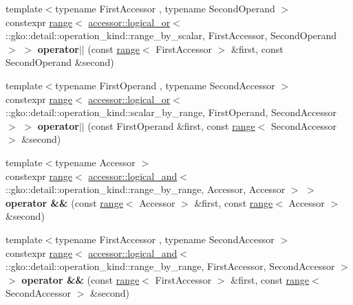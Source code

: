 \begin{DoxyCompactItemize}
\item 
\mbox{\label{namespacegko_ad2e2f0c77efabd6d47e3dbb4b2a8270b}} 
{\footnotesize template$<$typename First\+Accessor , typename Second\+Operand $>$ }\\constexpr \hyperlink{classgko_1_1range}{range}$<$ \hyperlink{structgko_1_1accessor_1_1logical__or}{accessor\+::logical\+\_\+or}$<$ \+::gko\+::detail\+::operation\+\_\+kind\+::range\+\_\+by\+\_\+scalar, First\+Accessor, Second\+Operand $>$ $>$ {\bfseries operator$\vert$$\vert$} (const \hyperlink{classgko_1_1range}{range}$<$ First\+Accessor $>$ \&first, const Second\+Operand \&second)
\item 
\mbox{\label{namespacegko_aa475e217d2a6cec2e7be2b5b67c1f411}} 
{\footnotesize template$<$typename First\+Operand , typename Second\+Accessor $>$ }\\constexpr \hyperlink{classgko_1_1range}{range}$<$ \hyperlink{structgko_1_1accessor_1_1logical__or}{accessor\+::logical\+\_\+or}$<$ \+::gko\+::detail\+::operation\+\_\+kind\+::scalar\+\_\+by\+\_\+range, First\+Operand, Second\+Accessor $>$ $>$ {\bfseries operator$\vert$$\vert$} (const First\+Operand \&first, const \hyperlink{classgko_1_1range}{range}$<$ Second\+Accessor $>$ \&second)
\item 
\mbox{\label{namespacegko_a23c09e269456c3664bdf93553e758ba5}} 
{\footnotesize template$<$typename Accessor $>$ }\\constexpr \hyperlink{classgko_1_1range}{range}$<$ \hyperlink{structgko_1_1accessor_1_1logical__and}{accessor\+::logical\+\_\+and}$<$ \+::gko\+::detail\+::operation\+\_\+kind\+::range\+\_\+by\+\_\+range, Accessor, Accessor $>$ $>$ {\bfseries operator \&\&} (const \hyperlink{classgko_1_1range}{range}$<$ Accessor $>$ \&first, const \hyperlink{classgko_1_1range}{range}$<$ Accessor $>$ \&second)
\item 
\mbox{\label{namespacegko_a2103d496963d4da9e264ff1e7440968a}} 
{\footnotesize template$<$typename First\+Accessor , typename Second\+Accessor $>$ }\\constexpr \hyperlink{classgko_1_1range}{range}$<$ \hyperlink{structgko_1_1accessor_1_1logical__and}{accessor\+::logical\+\_\+and}$<$ \+::gko\+::detail\+::operation\+\_\+kind\+::range\+\_\+by\+\_\+range, First\+Accessor, Second\+Accessor $>$ $>$ {\bfseries operator \&\&} (const \hyperlink{classgko_1_1range}{range}$<$ First\+Accessor $>$ \&first, const \hyperlink{classgko_1_1range}{range}$<$ Second\+Accessor $>$ \&second)

\end{DoxyCompactItemize}
